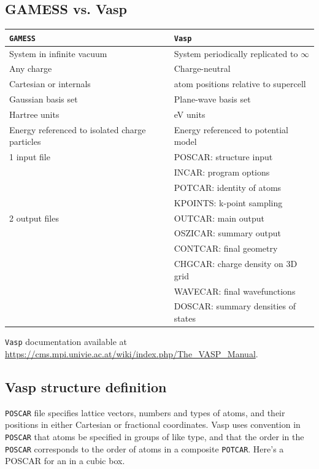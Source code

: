 \documentclass[11pt]{article}
\begin{document}
\subsection{GAMESS vs. Vasp}
\label{sec:org9489461}

\begin{center}
\begin{tabular}{ll}
\hline
\texttt{GAMESS} & \texttt{Vasp}\\
\hline
System in infinite vacuum & System periodically replicated to \(\infty\)\\
Any charge & Charge-neutral\\
Cartesian or internals & atom positions relative to supercell\\
Gaussian basis set & Plane-wave basis set\\
Hartree units & eV units\\
Energy referenced to isolated charge particles & Energy referenced to potential model\\
1 input file & POSCAR: structure input\\
 & INCAR: program options\\
 & POTCAR: identity of atoms\\
 & KPOINTS: k-point sampling\\
2 output files & OUTCAR: main output\\
 & OSZICAR: summary output\\
 & CONTCAR: final geometry\\
 & CHGCAR: charge density on 3D grid\\
 & WAVECAR: final wavefunctions\\
 & DOSCAR: summary densities of states\\
\hline
\end{tabular}
\end{center}

\texttt{Vasp} documentation available at \url{https://cms.mpi.univie.ac.at/wiki/index.php/The\_VASP\_Manual}.
\subsection{Vasp structure definition}
\label{sec:org091ee22}
\texttt{POSCAR} file specifies lattice vectors, numbers and types of atoms, and their positions in either Cartesian or fractional coordinates. Vasp uses convention in \texttt{POSCAR} that atoms be specified in groups of like type, and that the order in the \texttt{POSCAR} corresponds to the order of atoms in a composite \texttt{POTCAR}. Here’s a POSCAR for an  in a  cubic box.
\end{document}
